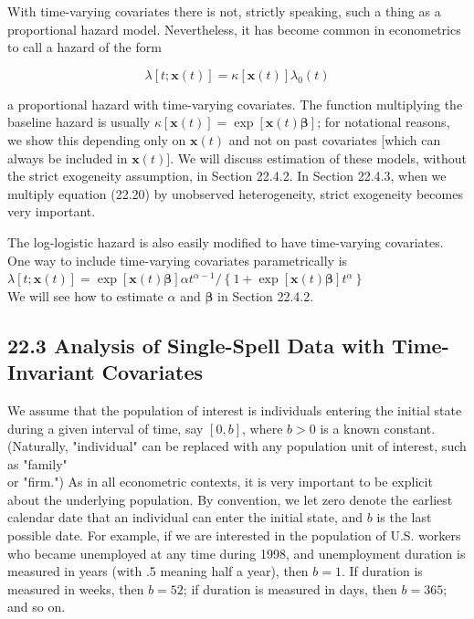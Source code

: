 \documentclass[10pt]{article}
\begin{document}
With time-varying covariates there is not, strictly speaking, such a thing as a proportional hazard model. Nevertheless, it has become common in econometrics to call a hazard of the form


\begin{equation*}
\lambda[t ; \mathbf{x}(t)]=\kappa[\mathbf{x}(t)] \lambda_{0}(t) \tag{22.20}
\end{equation*}


a proportional hazard with time-varying covariates. The function multiplying the baseline hazard is usually $\kappa[\mathbf{x}(t)]=\exp [\mathbf{x}(t) \boldsymbol{\beta}]$; for notational reasons, we show this depending only on $\mathbf{x}(t)$ and not on past covariates [which can always be included in $\mathbf{x}(t)]$. We will discuss estimation of these models, without the strict exogeneity assumption, in Section 22.4.2. In Section 22.4.3, when we multiply equation (22.20) by unobserved heterogeneity, strict exogeneity becomes very important.

The log-logistic hazard is also easily modified to have time-varying covariates. One way to include time-varying covariates parametrically is\\
$\lambda[t ; \mathbf{x}(t)]=\exp [\mathbf{x}(t) \boldsymbol{\beta}] \alpha t^{\alpha-1} /\left\{1+\exp [\mathbf{x}(t) \boldsymbol{\beta}] t^{\alpha}\right\}$\\
We will see how to estimate $\alpha$ and $\boldsymbol{\beta}$ in Section 22.4.2.

\subsection*{22.3 Analysis of Single-Spell Data with Time-Invariant Covariates}
We assume that the population of interest is individuals entering the initial state during a given interval of time, say $[0, b]$, where $b>0$ is a known constant. (Naturally, "individual" can be replaced with any population unit of interest, such as "family"\\
or "firm.") As in all econometric contexts, it is very important to be explicit about the underlying population. By convention, we let zero denote the earliest calendar date that an individual can enter the initial state, and $b$ is the last possible date. For example, if we are interested in the population of U.S. workers who became unemployed at any time during 1998, and unemployment duration is measured in years (with .5 meaning half a year), then $b=1$. If duration is measured in weeks, then $b=52$; if duration is measured in days, then $b=365$; and so on.
\end{document}

